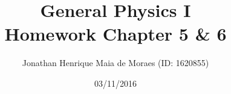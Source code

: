 \title{General Physics I \\ Homework Chapter 5 \& 6}
\author{Jonathan Henrique Maia de Moraes (ID: 1620855)}
\date{03/11/2016}
\maketitle
